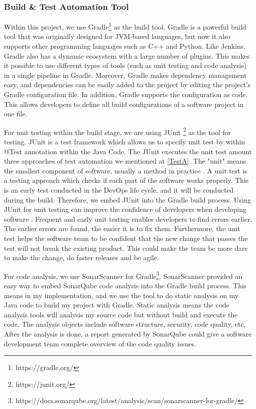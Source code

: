 \subsubsection{Build \& Test Automation Tool}
Within this project, we use Gradle\footnote{https://gradle.org/} as the build tool.
Gradle is a powerful build tool that was originally designed for JVM-based languages, but now it also supports other programming languages such as C++ and Python.
Like Jenkins, Gradle also has a dynamic ecosystem with a large number of plugins. This makes it possible to use different types of tools (such as unit testing and code analysis) in a single pipeline in Gradle. 
Moreover, Gradle makes dependency management easy, and dependencies can be easily added to the project by editing the project's Gradle configuration file. In addition, Gradle supports the configuration as code. This allows developers to define all build configurations of a software project in one file.
\par
For unit testing within the build stage, we are using JUnit \footnote{https://junit.org/} as the tool for testing. JUnit is a test framework which allows us to specify unit test by within @Test annotation within the Java Code. The JUnit executes the unit test amount three approaches of test automation we mentioned at \ref{TestA}. The "unit" means the smallest component of software, usually a method in practice \cite{UnitTest65:online}. A unit test is a testing approach which checks if each part of the software works properly. 
This is an early test conducted in the DevOps life cycle, and it will be conducted during the build. Therefore, we embed JUnit into the Gradle build process. Using JUnit for unit testing can improve the confidence of developers when developing software \cite{UnitTest65:online}. Frequent and early unit testing enables developers to find errors earlier. The earlier errors are found, the easier it is to fix them. Furthermore, the unit test helps the software team to be confident that the new change that passes the test will not break the existing product. This could make the team be more dare to make the change, do faster releases and be agile.
\par
For code analysis, we use SonarScanner for Gradle\footnote{https://docs.sonarqube.org/latest/analysis/scan/sonarscanner-for-gradle/}. SonarScanner provided an easy way to embed SonarQube code analysis into the Gradle build process. This means in my implementation, and we use the tool to do static analysis on my Java code to build my project with Gradle. Static analysis means the code analysis tools will analysis my source code but without build and execute the code. The analysis objects include software structure, security, code quality, etc. After the analysis is done, a report generated by SonarQube could give a software development team complete overview of the code quality issues. 
